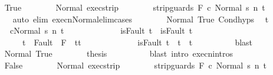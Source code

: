 \begin{isabellebody}
\ \ \ \ \ \ \isamarkupfalse%
\ True\isanewline
\ \ \ \ \ \ \isamarkupfalse%
\ Normal\ exec{\isacharunderscore}strip\isanewline
\ \ \ \ \ \ \isamarkupfalse%
\ {\isachardoublequoteopen}{\isasymGamma}{\isasymturnstile}{\isasymlangle}strip{\isacharunderscore}guards\ F\ c{}\ {\isacharcomma}Normal\ s{\isacharprime}{\isasymrangle}\ {\isacharequal}n{\isasymRightarrow}\ t{\isachardoublequoteclose}\isanewline
\ \ \ \ \ \ \ \ \isamarkupfalse%
\ {\isacharparenleft}auto\ elim{\isacharcolon}\ execn{\isacharunderscore}Normal{\isacharunderscore}elim{\isacharunderscore}cases{\isacharparenright}\isanewline
\ \ \ \ \ \ \isamarkupfalse%
\ Normal\ True\ Cond{\isachardot}hyps\ \isamarkupfalse%
\ t{\isacharprime}\isanewline
\ \ \ \ \ \ \ \ \ {\isachardoublequoteopen}{\isasymGamma}{\isasymturnstile}{\isasymlangle}c{}{\isacharcomma}Normal\ s{\isacharprime}{\isasymrangle}\ {\isacharequal}n{\isasymRightarrow}\ t{\isacharprime}{\isachardoublequoteclose}\ \isanewline
\ \ \ \ \ \ \ \ \ \ \ \ {\isachardoublequoteopen}isFault\ t\ {\isasymlongrightarrow}\ isFault\ t{\isacharprime}{\isachardoublequoteclose}\ \isanewline
\ \ \ \ \ \ \ \ \ \ \ \ {\isachardoublequoteopen}t{\isacharprime}\ {\isasymin}\ Fault\ {\isacharbackquote}\ {\isacharparenleft}{\isacharminus}F{\isacharparenright}\ {\isasymlongrightarrow}\ t{\isacharprime}{\isacharequal}t{\isachardoublequoteclose}\isanewline
\ \ \ \ \ \ \ \ \ \ \ \ {\isachardoublequoteopen}{\isasymnot}\ isFault\ t{\isacharprime}\ {\isasymlongrightarrow}\ t{\isacharprime}\ {\isacharequal}\ t{\isachardoublequoteclose}\isanewline
\ \ \ \ \ \ \ \ \isamarkupfalse%
\ blast\isanewline
\ \ \ \ \ \ \isamarkupfalse%
\ Normal\ True\isanewline
\ \ \ \ \ \ \isamarkupfalse%
\ {\isacharquery}thesis\isanewline
\ \ \ \ \ \ \ \ \isamarkupfalse%
\ {\isacharparenleft}blast\ intro{\isacharcolon}\ execn{\isachardot}intros{\isacharparenright}\isanewline
\ \ \ \ \isamarkupfalse%
\isanewline
\ \ \ \ \ \ \isamarkupfalse%
\ False\isanewline
\ \ \ \ \ \ \isamarkupfalse%
\ Normal\ exec{\isacharunderscore}strip\isanewline
\ \ \ \ \ \ \isamarkupfalse%
\ {\isachardoublequoteopen}{\isasymGamma}{\isasymturnstile}{\isasymlangle}strip{\isacharunderscore}guards\ F\ c{}\ {\isacharcomma}Normal\ s{\isacharprime}{\isasymrangle}\ {\isacharequal}n{\isasymRightarrow}\ t{\isachardoublequoteclose}\isanewline
\ \ \ \ \ \ \ \ \isamarkupfalse%

\end{isabellebody}
